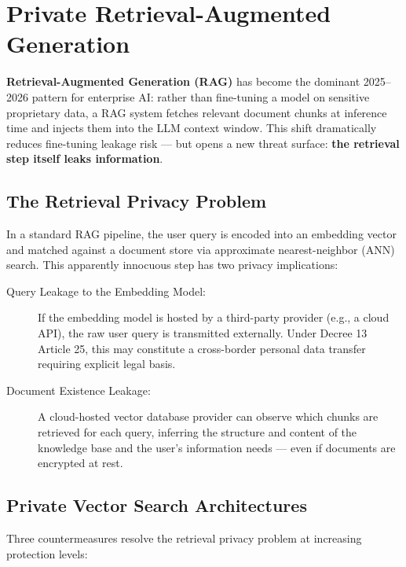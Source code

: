\section{Private Retrieval-Augmented Generation}
\label{sec:private_rag}

\textbf{Retrieval-Augmented Generation (RAG)} has become the dominant 2025--2026 pattern for enterprise AI: rather than fine-tuning a model on sensitive proprietary data, a RAG system fetches relevant document chunks at inference time and injects them into the LLM context window. This shift dramatically reduces fine-tuning leakage risk — but opens a new threat surface: \textbf{the retrieval step itself leaks information}.

\subsection{The Retrieval Privacy Problem}
\label{subsec:rag_privacy_problem}

In a standard RAG pipeline, the user query is encoded into an embedding vector and matched against a document store via approximate nearest-neighbor (ANN) search. This apparently innocuous step has two privacy implications:

\begin{description}
  \item[Query Leakage to the Embedding Model:] If the embedding model is hosted by a third-party provider (e.g., a cloud API), the raw user query is transmitted externally. Under Decree 13 Article 25, this may constitute a cross-border personal data transfer requiring explicit legal basis.
  \item[Document Existence Leakage:] A cloud-hosted vector database provider can observe which chunks are retrieved for each query, inferring the structure and content of the knowledge base and the user's information needs — even if documents are encrypted at rest.
\end{description}

\subsection{Private Vector Search Architectures}
\label{subsec:private_vector_search}

Three countermeasures resolve the retrieval privacy problem at increasing protection levels:

